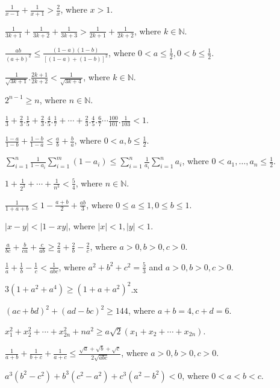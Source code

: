 \item $\frac{1}{x - 1} + \frac{1}{x + 1} > \frac{2}{x}$, where $x > 1$.
\item $\frac{1}{3k + 1} + \frac{1}{3k + 2} + \frac{1}{3k + 3} > \frac{1}{2k + 1} + \frac{1}{2k + 2}$, where $k\in\mathbb{N}$.
\item $\frac{ab}{(a + b)^2}\leq \frac{(1 - a)(1 - b)}{[(1 - a) + (1 - b)]^2}$, where $0 < a\leq\frac{1}{2}, 0<b\leq\frac{1}{2}$.
\item $\frac{1}{\sqrt{3k + 1}}.\frac{2k + 1}{2k + 2} < \frac{1}{\sqrt{3k + 4}}$, where $k\in\mathbb{N}$.
\item $2^{n - 1}\geq n$, where $n\in\mathbb{N}$.
\item $\frac{1}{3} + \frac{2}{3}.\frac{1}{5} + \frac{2}{3}.\frac{4}{5}.\frac{1}{7} + \cdots +
  \frac{2}{3}.\frac{4}{5}.\frac{6}{7}\cdots \frac{100}{101}.\frac{1}{103} < 1$.
\item $\frac{1 - a}{1 - b} + \frac{1 - b}{1 - a}\leq \frac{a}{b} + \frac{b}{a}$, where $0 < a, b\leq \frac{1}{2}$.
\item $\displaystyle\sum_{i=1}^n\frac{1}{1 - a_i}\sum_{i=1}^m(1 - a_i)\leq \sum_{i=1}^n\frac{1}{a_i}\sum_{i=1}^na_i$, where $0 < a_1, \ldots,
  a_n\leq \frac{1}{2}$.
\item $1 + \frac{1}{2^3} + \cdots + \frac{1}{n^3} < \frac{5}{4}$, where $n\in\mathbb{N}$.
\item $\frac{1}{1 + a + b}\leq 1 - \frac{a + b}{2} + \frac{ab}{3}$, where $0\leq a\leq 1, 0\leq b\leq 1$.
\item $|x - y| < |1 - xy|$, where $|x| < 1, |y| < 1$.
\item $\frac{a}{bc} + \frac{b}{ca} + \frac{c}{ab}\geq \frac{2}{a} + \frac{2}{b} - \frac{2}{c}$, where $a > 0, b > 0, c > 0$.
\item $\frac{1}{a} + \frac{1}{b} - \frac{1}{c} < \frac{1}{abc}$, where $a^2 + b^2 + c^2 = \frac{5}{3}$ and $a > 0, b > 0, c > 0$.
\item $3(1 + a^2 + a^4)\geq (1 + a + a^2)^2$.x
\item $(ac + bd)^2 + (ad - bc)^2\geq 144$, where $a + b = 4, c + d = 6$.
\item $x_1^2 + x_2^2 + \cdots + x_{2n}^2 + na^2 \geq a\sqrt{2}(x_1 + x_2 + \cdots + x_{2n})$.
\item $\frac{1}{a + b} + \frac{1}{b + c} + \frac{1}{a + c}\leq \frac{\sqrt{a} + \sqrt{b} + \sqrt{c}}{2\sqrt{abc}}$, where $a > 0, b
  > 0, c > 0$.
\item $a^3(b^2 - c^2) + b^3(c^2 - a^2) + c^3(a^2 - b^2) < 0$, where $0 < a < b < c$.
